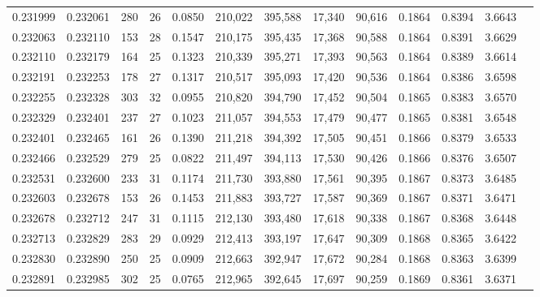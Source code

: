 \begin{tabular}{rrrrrrrrrrrrr}
0.231999 & 0.232061 &   280 &  26 &                                     0.0850 & 210,022 & 395,588 &  17,340 &  90,616 & 0.1864 & 0.8394 & 3.6643 \\
0.232063 & 0.232110 &   153 &  28 &                                     0.1547 & 210,175 & 395,435 &  17,368 &  90,588 & 0.1864 & 0.8391 & 3.6629 \\
0.232110 & 0.232179 &   164 &  25 &                                     0.1323 & 210,339 & 395,271 &  17,393 &  90,563 & 0.1864 & 0.8389 & 3.6614 \\
0.232191 & 0.232253 &   178 &  27 &                                     0.1317 & 210,517 & 395,093 &  17,420 &  90,536 & 0.1864 & 0.8386 & 3.6598 \\
0.232255 & 0.232328 &   303 &  32 &                                     0.0955 & 210,820 & 394,790 &  17,452 &  90,504 & 0.1865 & 0.8383 & 3.6570 \\
0.232329 & 0.232401 &   237 &  27 &                                     0.1023 & 211,057 & 394,553 &  17,479 &  90,477 & 0.1865 & 0.8381 & 3.6548 \\
0.232401 & 0.232465 &   161 &  26 &                                     0.1390 & 211,218 & 394,392 &  17,505 &  90,451 & 0.1866 & 0.8379 & 3.6533 \\
0.232466 & 0.232529 &   279 &  25 &                                     0.0822 & 211,497 & 394,113 &  17,530 &  90,426 & 0.1866 & 0.8376 & 3.6507 \\
0.232531 & 0.232600 &   233 &  31 &                                     0.1174 & 211,730 & 393,880 &  17,561 &  90,395 & 0.1867 & 0.8373 & 3.6485 \\
0.232603 & 0.232678 &   153 &  26 &                                     0.1453 & 211,883 & 393,727 &  17,587 &  90,369 & 0.1867 & 0.8371 & 3.6471 \\
0.232678 & 0.232712 &   247 &  31 &                                     0.1115 & 212,130 & 393,480 &  17,618 &  90,338 & 0.1867 & 0.8368 & 3.6448 \\
0.232713 & 0.232829 &   283 &  29 &                                     0.0929 & 212,413 & 393,197 &  17,647 &  90,309 & 0.1868 & 0.8365 & 3.6422 \\
0.232830 & 0.232890 &   250 &  25 &                                     0.0909 & 212,663 & 392,947 &  17,672 &  90,284 & 0.1868 & 0.8363 & 3.6399 \\
0.232891 & 0.232985 &   302 &  25 &                                     0.0765 & 212,965 & 392,645 &  17,697 &  90,259 & 0.1869 & 0.8361 & 3.6371 \\

\end{tabular}
